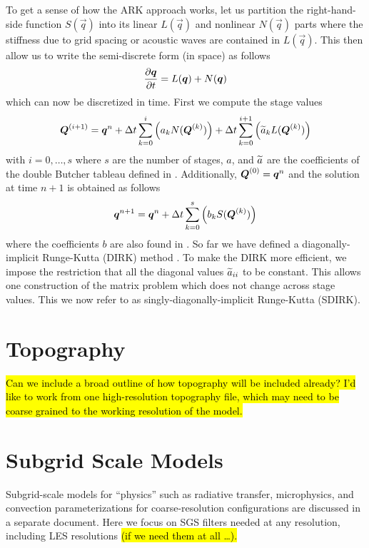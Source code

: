 \documentclass{article}
\begin{document}
To get a sense of how the ARK approach works, let us partition the right-hand-side function $S(\vec{q})$ into its linear $L(\vec{q})$ and nonlinear $N(\vec{q})$ parts where the stiffness due to grid spacing or acoustic waves are contained in $L(\vec{q})$.  This then allow us to write the semi-discrete form (in space) as follows
\[
\frac{\partial \boldsymbol{{q}}}{\partial t} = L(\boldsymbol{{q}}) + N(\boldsymbol{{q}}) 
\]
which can now be discretized in time.  First we compute the stage values
\[
\boldsymbol{{Q}}^{(i+1)}=\boldsymbol{{q}}^n + \Delta t \sum_{k=0}^{i} \left( a_k N(\boldsymbol{{Q}}^{(k)}) \right) + \Delta t \sum_{k=0}^{i+1} \left( \widetilde{a}_k L(\boldsymbol{{Q}}^{(k)}) \right)
\]
with $i=0,\ldots,s$ where $s$ are the number of stages, $a$, and $\widetilde{a}$ are the coefficients of the double Butcher tableau defined in \citet{kennedy:2003,giraldo:2013}.  Additionally, 
$\boldsymbol{{Q}}^{(0)}=\boldsymbol{{q}}^n$ and the solution at time $n+1$ is obtained as follows
\[
\boldsymbol{{q}}^{n+1}=\boldsymbol{{q}}^n + \Delta t \sum_{k=0}^{s} \left( b_k S(\boldsymbol{{Q}}^{(k)}) \right)
\]
where the coefficients $b$ are also found in \citet{kennedy:2003,giraldo:2013}.
So far we have defined a diagonally-implicit Runge-Kutta (DIRK) method \citep{alexander:1977,butcher:1981a,ascher:1997,boscarino:2009}.  To make the DIRK more efficient, we impose the restriction that all the diagonal values $\widetilde{a}_{ii}$ to be constant. This allows one construction of the matrix problem which does not change across stage values.  This we now refer to as singly-diagonally-implicit Runge-Kutta (SDIRK).

\section{Topography}

\hl{Can we include a broad outline of how topography will be included already? I'd like to work from one high-resolution topography file, which may need to be coarse grained to the working resolution of the model.}

\section{Subgrid Scale Models}
\label{sec:sgs_models}

Subgrid-scale models for ``physics'' such as radiative transfer, microphysics, and convection parameterizations for coarse-resolution configurations are discussed in a separate document. Here we focus on SGS filters needed at any resolution, including LES resolutions \hl{(if we need them at all \dots).}
\end{document}

